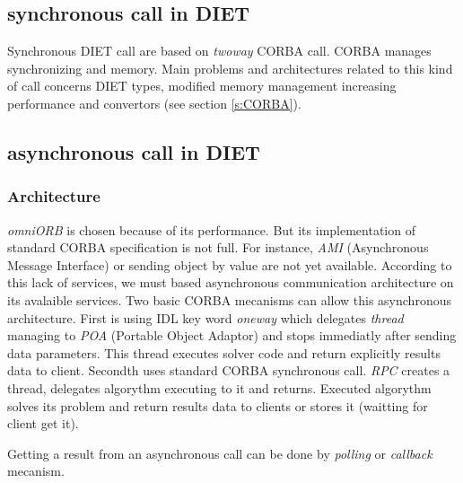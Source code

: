 

  \subsection{synchronous call in DIET}
  Synchronous DIET call are based on \emph{twoway} CORBA call. CORBA manages synchronizing
  and memory. Main problems and architectures related to this kind of call concerns
  DIET types, modified memory management increasing performance and convertors (see section \ref{s:CORBA}).

  \subsection{asynchronous call in DIET}

  \subsubsection{Architecture}

  \emph{omniORB} is chosen because of its performance. But its implementation
  of standard CORBA specification is not full. For instance, \emph{AMI}
  (Asynchronous Message Interface) or sending object by value are not yet
  available. According to this lack of services, we must based asynchronous
  communication architecture on its avalaible services.
  Two basic CORBA mecanisms can allow this asynchronous architecture.
  First is using IDL key word \emph{oneway} which delegates \emph{thread} managing
  to \emph{POA} (Portable Object Adaptor) and stops immediatly after sending data parameters. This thread
  executes solver code and return explicitly results data to client.
  Secondth uses standard CORBA synchronous call.
  \emph{RPC} creates a thread, delegates algorythm executing to it and returns.
  Executed algorythm solves its problem and return results data to clients or stores
  it (waitting for client get it).

  Getting a result from an asynchronous call can be done by \emph{polling} or
  \emph{callback} mecanism.

